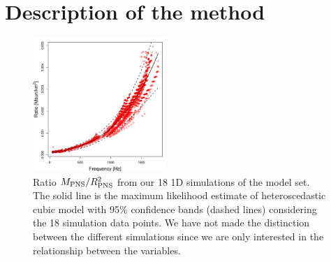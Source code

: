 \section{Description of the method}
\label{methods}

\begin{figure}[t]
 \centering
 \includegraphics[width=0.45\textwidth]{plots/model}
 \caption{Ratio $M_{\rm PNS}/R_{\rm PNS}^2$ from our 18 1D simulations of the model set. The solid line is the maximum likelihood estimate of heteroscedastic cubic model with 95\% confidence bands (dashed lines) considering the 18 simulation data points. We have not made the distinction between the different simulations since we are only interested in the relationship between the variables.}
 \label{fig:LMVAR}
\end{figure}

